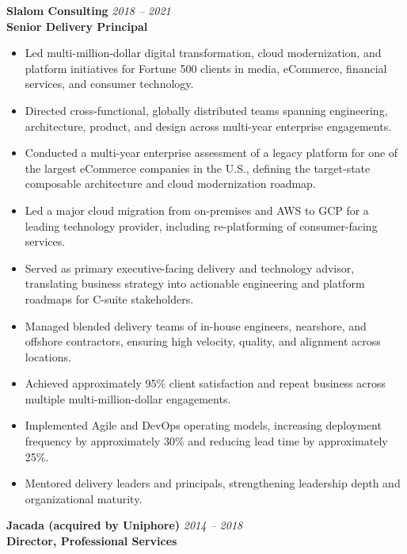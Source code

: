 \documentclass[11pt]{article}
\begin{document}
\vspace{6pt}

\pagebreak

\textbf{Slalom Consulting} \hfill \textit{2018 -- 2021} \\
\textbf{Senior Delivery Principal}

\begin{itemize}
  \item Led multi-million-dollar digital transformation, cloud modernization, and platform initiatives for Fortune 500 clients in media, eCommerce, financial services, and consumer technology.
  \item Directed cross-functional, globally distributed teams spanning engineering, architecture, product, and design across multi-year enterprise engagements.
  \item Conducted a multi-year enterprise assessment of a legacy platform for one of the largest eCommerce companies in the U.S., defining the target-state composable architecture and cloud modernization roadmap.
  \item Led a major cloud migration from on-premises and AWS to GCP for a leading technology provider, including re-platforming of consumer-facing services.
  \item Served as primary executive-facing delivery and technology advisor, translating business strategy into actionable engineering and platform roadmaps for C-suite stakeholders.
  \item Managed blended delivery teams of in-house engineers, nearshore, and offshore contractors, ensuring high velocity, quality, and alignment across locations.
  \item Achieved approximately 95\% client satisfaction and repeat business across multiple multi-million-dollar engagements.
  \item Implemented Agile and DevOps operating models, increasing deployment frequency by approximately 30\% and reducing lead time by approximately 25\%.
  \item Mentored delivery leaders and principals, strengthening leadership depth and organizational maturity.
\end{itemize}

\vspace{6pt}

\textbf{Jacada (acquired by Uniphore)} \hfill \textit{2014 -- 2018} \\
\textbf{Director, Professional Services}
\end{document}
